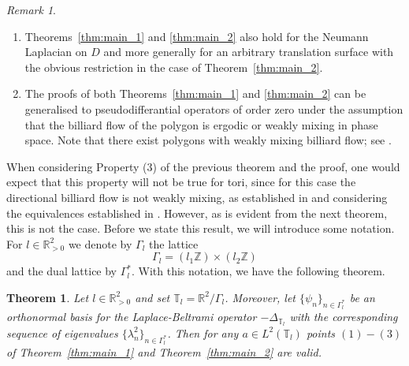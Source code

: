 \documentclass[11pt,twoside,reqno]{amsart}
\newcommand{\R}{\mathbb{R}}
\newcommand{\Z}{\mathbb{Z}}
\newcommand{\1}{\mathrm{\mathbf{1}}}
\numberwithin{equation}{section}
\theoremstyle{plain}
\newtheorem{theorem}[thm]{Theorem}
\theoremstyle{definition}
\theoremstyle{remark}
\newtheorem{remark}[thm]{Remark}
\begin{document}
\begin{remark}
$ $ \\ 
\vspace{-1em}
\begin{enumerate}[label=\textnormal{(\roman*)}]
    \item  Theorems~\ref{thm:main_1} and \ref{thm:main_2} also hold for the Neumann Laplacian on $D$ and more generally for an arbitrary translation surface with the obvious restriction in the case of Theorem~\ref{thm:main_2}.

    \item The proofs of both Theorems~\ref{thm:main_1} and \ref{thm:main_2} can be generalised to pseudodifferantial operators of order zero under the assumption that the billiard flow of the polygon is ergodic or weakly mixing in phase space. Note that there exist polygons with weakly mixing billiard flow; see \cite{MR5067163}.
\end{enumerate}
\end{remark}

When considering Property (3) of the previous theorem and the proof, one would expect that this property will not be true for tori, since for this case the directional billiard flow is not weakly mixing, as established in \cite{aranaherrera2024weakmixingrationalbilliards} and considering the equivalences established in \cite{Zel05}. However, as is evident from the next theorem, this is not the case. Before we state this result, we will introduce some notation. For $l\in \R^2_{>0}$ we denote by $\Gamma_l$ the lattice
\begin{equation*}
    \Gamma_l = ( l_1 \Z) \times ( l_2 \Z)
\end{equation*}
and the dual lattice by $\Gamma_l^{*}$. With this notation, we have the following theorem.


\begin{theorem}
    \label{Thm:Main_theorem_tori}
    Let $l\in \R^2_{>0}$ and set $\mathbb{T}_{l} = \R^2 \big/ \Gamma_{l}$. Moreover, let $\{\psi_{n}\}_{n\in\Gamma_l^{*}}$ be an orthonormal basis for the Laplace-Beltrami operator $-\Delta_{\mathbb{T}_{l}}$ with the corresponding sequence of eigenvalues $\{\lambda_{n}^2\}_{n\in\Gamma_l^{*}}$. 
    Then for any $a\in L^2(\mathbb{T}_{l})$ points $(1)-(3)$ of Theorem~\ref{thm:main_1} and Theorem~\ref{thm:main_2} are valid.
\end{theorem}
\end{document}
